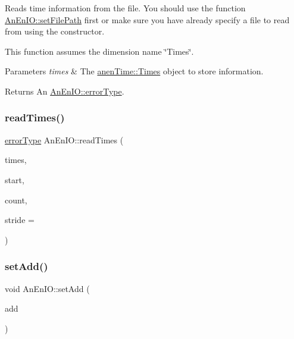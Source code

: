 Reads time information from the file. You should use the function \mbox{\hyperlink{class_an_en_i_o_a98066d375cc78694fda2af1ce37cc8d8}{An\+En\+I\+O\+::set\+File\+Path}} first or make sure you have already specify a file to read from using the constructor.

This function assumes the dimension name \char`\"{}\+Times\char`\"{}.


\begin{DoxyParams}{Parameters}
{\em times} & The \mbox{\hyperlink{classanen_time_1_1_times}{anen\+Time\+::\+Times}} object to store information. \\
\hline
\end{DoxyParams}
\begin{DoxyReturn}{Returns}
An \mbox{\hyperlink{class_an_en_i_o_aa56bc1ec6610b86db4349bce20f9ead0}{An\+En\+I\+O\+::error\+Type}}. 
\end{DoxyReturn}
\mbox{\label{class_an_en_i_o_aecbace06ce451ccad367d0150ef6aaf9}} 
\subsubsection{\texorpdfstring{read\+Times()}{readTimes()}\hspace{0.1cm}{\footnotesize\ttfamily [2/2]}}
{\footnotesize\ttfamily \mbox{\hyperlink{class_an_en_i_o_aa56bc1ec6610b86db4349bce20f9ead0}{error\+Type}} An\+En\+I\+O\+::read\+Times (\begin{DoxyParamCaption}\item[{\mbox{\hyperlink{classanen_time_1_1_times}{anen\+Time\+::\+Times}} \&}]{times,  }\item[{size\+\_\+t}]{start,  }\item[{size\+\_\+t}]{count,  }\item[{ptrdiff\+\_\+t}]{stride = {} }\end{DoxyParamCaption})}

\mbox{\label{class_an_en_i_o_ada3447ac52d460ae2cbc355dcd55bd35}} 
\subsubsection{\texorpdfstring{set\+Add()}{setAdd()}}
{\footnotesize\ttfamily void An\+En\+I\+O\+::set\+Add (\begin{DoxyParamCaption}\item[{bool}]{add }\end{DoxyParamCaption})}

